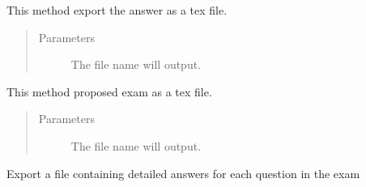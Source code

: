 \documentclass[letterpaper,10pt,english]{sphinxmanual}
\begin{document}
\begin{fulllineitems}
\begin{fulllineitems}
\end{fulllineitems}


\begin{fulllineitems}
\label{\detokenize{index:pytexexam.latexexam.LatexExam.export_tex_answer}}
This method export the answer as a tex file.
\begin{quote}\begin{description}
\item[{Parameters}] \leavevmode
{} \textendash{} The file name will output.

\end{description}\end{quote}

\end{fulllineitems}


\begin{fulllineitems}
\label{\detokenize{index:pytexexam.latexexam.LatexExam.export_tex_exam}}
This method proposed exam as a tex file.
\begin{quote}\begin{description}
\item[{Parameters}] \leavevmode
{} \textendash{} The file name will output.

\end{description}\end{quote}

\end{fulllineitems}


\begin{fulllineitems}
\label{\detokenize{index:pytexexam.latexexam.LatexExam.export_tex_solution}}
Export a file containing detailed answers for each question in the exam


\end{fulllineitems}
\end{fulllineitems}
\end{document}
